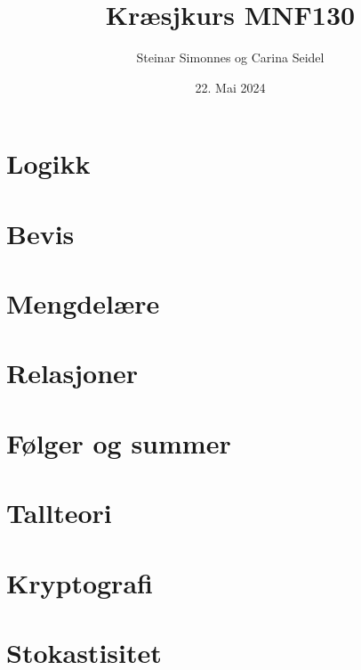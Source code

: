 \documentclass[aspectratio=169,fleqn,handout,xcolor={dvipsnames}]{beamer}
\author[ls]{Steinar Simonnes og Carina Seidel}
\title[sgp]{Kræsjkurs MNF130}
\institute{Institutt for Informatikk \\ Universitetet i Bergen}
\date[22.05.24]{22. Mai 2024}
\begin{document}


\section{Logikk}




\section{Bevis}




\section{Mengdelære}


% 


\section{Relasjoner}






\section{Følger og summer}


\section{Tallteori}





\section{Kryptografi}




\section{Stokastisitet}



\end{document}

